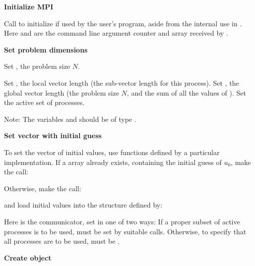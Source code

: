 \begin{Steps}
  
\item 
  {\bf {\p} Initialize MPI}

  Call  to initialize {\mpi} if used by
  the user's program, aside from the internal use in {\nvecp}.  
  Here  and  are the command line argument 
  counter and array received by .
  
\item
  {\bf Set problem dimensions}

  {\s} Set , the problem size $N$.

  {\p} Set , the local vector length (the sub-vector length for this process).
  Set , the global vector length (the problem size $N$, and the sum of all the
  values of ).  Set the active set of processes.

  Note: The variables  and  should be of type .

\item
  {\bf Set vector with initial guess}
 
  To set the vector  of initial values, use functions defined by a
  particular {\nvector} implementation.  If a  array  
  already exists, containing the initial guess of $u_0$, make the call:

  {\s} 

  {\p} 

  Otherwise, make the call:

  {\s} 

  {\p} 

  and load initial values into the structure defined by:

  {\s} 

  {\p} 

  Here  is the {\mpi} communicator, set in one of two ways: 
  If a proper subset of active processes is to be used,  
  must be set by suitable {\mpi} calls. Otherwise, to specify that all 
  processes are to be used,  must be .
  
\item\label{i:kinsol_create} 
  {\bf Create {\kinsol} object}


\end{Steps}
